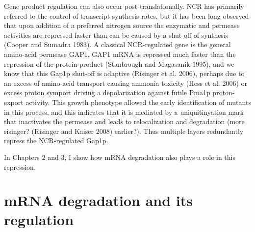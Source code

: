 Gene product
regulation can also occur post-translationally. NCR has primarily
referred to the control of transcript synthesis rates, but it has been
long observed that upon addition of a preferred nitrogen source the
enzymatic and permease activities are repressed faster than can be
caused by a shut-off of synthesis (Cooper and Sumadra 1983). A
classical NCR-regulated gene is the general amino-acid permease GAP1.
GAP1 mRNA is repressed much faster than the repression of the
protein-product (Stanbrough and Magasanik 1995), and we know that this
Gap1p shut-off is adaptive (Risinger et al. 2006), perhaps due to an
excess of amino-acid transport causing ammonia toxicity (Hess et al.
2006) or excess proton symport driving a depolarization against futile
Pma1p proton-export activity. This growth phenotype allowed the early
identification of mutants in this process, and this indicates that it
is mediated by a uniquitinyation mark that inactivates the permease
and leads to relocalization and degradation (more risinger? (Risinger
and Kaiser 2008) earlier?). Thus multiple layers redundantly repress
the NCR-regulated Gap1p.  

In Chapters 2 and 3, I show how mRNA
degradation also plays a role in this repression.  

\section{mRNA degradation and its regulation}

